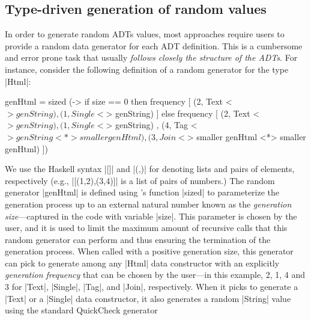 

\subsection{Type-driven generation of random values}

In order to generate random ADTs values, most approaches require users to provide
a random data generator for each ADT definition.
%
This is a cumbersome and error prone task that usually \emph{follows closely the
  structure of the ADTs}.
%
For instance, consider the following definition of a \quickcheck random
generator for the type |Html|:
%
\begin{code}
genHtml = sized (\size ->
  if size == 0
  then frequency
  [  (2,  Text    <$> genString)
  ,  (1,  Single  <$> genString) ]
  else frequency
  [  (2,  Text    <$> genString)
  ,  (1,  Single  <$> genString)
  ,  (4,  Tag     <$> genString <*> smaller genHtml)
  ,  (3,  Join    <$> smaller genHtml <*> smaller genHtml) ])
\end{code} %
%
We use the Haskell syntax |[]| and |(,)| for denoting lists and pairs of
elements, respectively (e.g., |[(1,2),(3,4)]| is a list of pairs of numbers.)
%
The random generator |genHtml| is defined using \quickcheck's function |sized|
to parameterize the generation process up to an external natural number known as
the \emph{generation size}---captured in the code with variable |size|.
%
This parameter is chosen by the user, and it is used to limit the maximum amount
of recursive calls that this random generator can perform and thus ensuring
the termination of the generation process.
%
When called with a positive generation size, this generator can pick to generate
among any |Html| data constructor with an explicitly \emph{generation frequency}
that can be chosen by the user---in this example, 2, 1, 4 and 3 for |Text|,
|Single|, |Tag|, and |Join|, respectively.
%
When it picks to generate a |Text| or a |Single| data constructor, it also
generates a random |String| value using the standard QuickCheck generator
